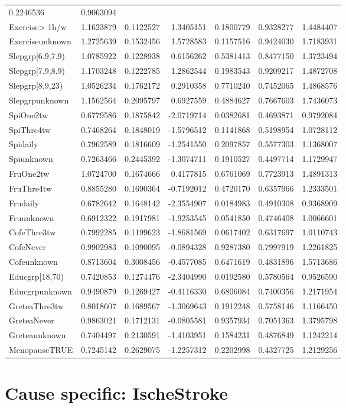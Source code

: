 \documentclass[]{article}
\begin{document}
\begin{longtable}[]{@{}lrrrrrr@{}}
0.2246536 & 0.9063094\tabularnewline
Exercise\textgreater{} 1h/w & 1.1623879 & 0.1122527 & 1.3405151 &
0.1800779 & 0.9328277 & 1.4484407\tabularnewline
Exerciseunknown & 1.2725639 & 0.1532456 & 1.5728583 & 0.1157516 &
0.9424030 & 1.7183931\tabularnewline
Slepgrp{[}6.9,7.9) & 1.0785922 & 0.1228938 & 0.6156262 & 0.5381413 &
0.8477150 & 1.3723494\tabularnewline
Slepgrp{[}7.9,8.9) & 1.1703248 & 0.1222785 & 1.2862544 & 0.1983543 &
0.9209217 & 1.4872708\tabularnewline
Slepgrp{[}8.9,23) & 1.0526234 & 0.1762172 & 0.2910358 & 0.7710240 &
0.7452065 & 1.4868576\tabularnewline
Slepgrpunknown & 1.1562564 & 0.2095797 & 0.6927559 & 0.4884627 &
0.7667603 & 1.7436073\tabularnewline
SpiOne2tw & 0.6779586 & 0.1875842 & -2.0719714 & 0.0382681 & 0.4693871 &
0.9792084\tabularnewline
SpiThre4tw & 0.7468264 & 0.1848019 & -1.5796512 & 0.1141868 & 0.5198954
& 1.0728112\tabularnewline
Spidaily & 0.7962589 & 0.1816609 & -1.2541550 & 0.2097857 & 0.5577303 &
1.1368007\tabularnewline
Spiunknown & 0.7263466 & 0.2445392 & -1.3074711 & 0.1910527 & 0.4497714
& 1.1729947\tabularnewline
FruOne2tw & 1.0724700 & 0.1674666 & 0.4177815 & 0.6761069 & 0.7723913 &
1.4891313\tabularnewline
FruThre4tw & 0.8855280 & 0.1690364 & -0.7192012 & 0.4720170 & 0.6357966
& 1.2333501\tabularnewline
Frudaily & 0.6782642 & 0.1648142 & -2.3554907 & 0.0184983 & 0.4910308 &
0.9368909\tabularnewline
Fruunknown & 0.6912322 & 0.1917981 & -1.9253545 & 0.0541850 & 0.4746408
& 1.0066601\tabularnewline
CofeThre3tw & 0.7992285 & 0.1199623 & -1.8681569 & 0.0617402 & 0.6317697
& 1.0110743\tabularnewline
CofeNever & 0.9902983 & 0.1090095 & -0.0894328 & 0.9287380 & 0.7997919 &
1.2261825\tabularnewline
Cofeunknown & 0.8713604 & 0.3008456 & -0.4577085 & 0.6471619 & 0.4831896
& 1.5713686\tabularnewline
Educgrp{[}18,70) & 0.7420853 & 0.1274476 & -2.3404990 & 0.0192580 &
0.5780564 & 0.9526590\tabularnewline
Educgrpunknown & 0.9490879 & 0.1269427 & -0.4116330 & 0.6806084 &
0.7400356 & 1.2171954\tabularnewline
GreteaThre3tw & 0.8018607 & 0.1689567 & -1.3069643 & 0.1912248 &
0.5758146 & 1.1166450\tabularnewline
GreteaNever & 0.9863021 & 0.1712131 & -0.0805581 & 0.9357934 & 0.7051363
& 1.3795798\tabularnewline
Greteaunknown & 0.7404497 & 0.2130591 & -1.4103951 & 0.1584231 &
0.4876849 & 1.1242214\tabularnewline
MenopauseTRUE & 0.7245142 & 0.2629075 & -1.2257312 & 0.2202998 &
0.4327725 & 1.2129256\tabularnewline
\bottomrule
\end{longtable}

\hypertarget{cause-specific-ischestroke}{%
\section{Cause specific: IscheStroke}\label{cause-specific-ischestroke}}
\end{document}
